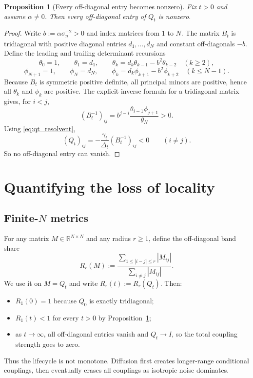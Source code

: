 \documentclass[11pt]{article}
\newtheorem{proposition}{Proposition}[section]
\newcommand{\R}{\mathbb{R}}
\newcommand{\Id}{I}
\newcommand{\abs}[1]{\left| #1 \right|}
\begin{document}
\begin{proposition}[Every off-diagonal entry becomes nonzero]\label{prop:all_nonzero}
Fix $t>0$ and assume $\alpha\ne 0$. Then every off-diagonal entry of $Q_t$ is nonzero.
\end{proposition}

\begin{proof}
Write $b:=\alpha\sigma_\eta^{-2}>0$ and index matrices from $1$ to $N$. The matrix $B_t$ is tridiagonal with positive diagonal entries $d_1,\dots,d_N$ and constant off-diagonals $-b$. Define the leading and trailing determinant recursions
\[
\theta_0=1,
\qquad
\theta_1=d_1,
\qquad
\theta_k=d_k\theta_{k-1}-b^2\theta_{k-2}
\quad (k\ge 2),
\]
\[
\phi_{N+1}=1,
\qquad
\phi_N=d_N,
\qquad
\phi_k=d_k\phi_{k+1}-b^2\phi_{k+2}
\quad (k\le N-1).
\]
Because $B_t$ is symmetric positive definite, all principal minors are positive, hence all $\theta_k$ and $\phi_k$ are positive. The explicit inverse formula for a tridiagonal matrix gives, for $i<j$,
\[
(B_t^{-1})_{ij}=b^{j-i}\frac{\theta_{i-1}\phi_{j+1}}{\theta_N}>0.
\]
Using \eqref{eq:qt_resolvent},
\[
(Q_t)_{ij}=-\frac{\gamma_t}{\Delta_t}(B_t^{-1})_{ij}<0
\qquad (i\ne j).
\]
So no off-diagonal entry can vanish.
\end{proof}

\section{Quantifying the loss of locality}
\subsection{Finite-$N$ metrics}
For any matrix $M\in\R^{N\times N}$ and any radius $r\ge 1$, define the off-diagonal band share
\begin{equation}\label{eq:Rr_def}
R_r(M):=
\frac{\sum_{1\le \abs{i-j}\le r}\abs{M_{ij}}}{\sum_{i\ne j}\abs{M_{ij}}}.
\end{equation}
We use it on $M=Q_t$ and write $R_r(t):=R_r(Q_t)$. Then:
\begin{itemize}[leftmargin=1.5em]
\item $R_1(0)=1$ because $Q_0$ is exactly tridiagonal;
\item $R_1(t)<1$ for every $t>0$ by Proposition~\ref{prop:all_nonzero};
\item as $t\to\infty$, all off-diagonal entries vanish and $Q_t\to\Id$, so the total coupling strength goes to zero.
\end{itemize}
Thus the lifecycle is not monotone. Diffusion first creates longer-range conditional couplings, then eventually erases all couplings as isotropic noise dominates.
\end{document}
